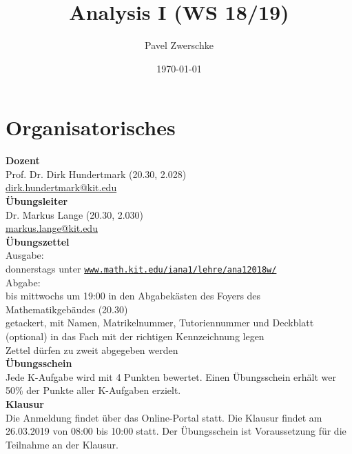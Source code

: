 \documentclass[12pt,a4paper,titlepage]{article} %
\theoremstyle{definition}
\theoremstyle{remark}
\begin{document}
\title{Analysis I (WS 18/19)}
\date{\today}
\author{Pavel Zwerschke}
\maketitle

\tableofcontents
\newpage

\setcounter{section}{-1}
\section{Organisatorisches}
\textbf{Dozent}\\
Prof. Dr. Dirk Hundertmark (20.30, 2.028)\\
\href{mailto:dirk.hundertmark@kit.edu}{dirk.hundertmark@kit.edu}\\
\textbf{Übungsleiter}\\
Dr. Markus Lange (20.30, 2.030)\\
\href{mailto:markus.lange@kit.edu}{markus.lange@kit.edu}\\
\textbf{Übungszettel}\\
Ausgabe:\\
donnerstags unter \href{http://www.math.kit.edu/iana1/lehre/ana12018w/}{\texttt{www.math.kit.edu/iana1/lehre/ana12018w/}}\\
Abgabe:\\
bis mittwochs um 19:00 in den Abgabekästen des Foyers des Mathematikgebäudes (20.30)\\
getackert, mit Namen, Matrikelnummer, Tutoriennummer und Deckblatt (optional) in das Fach mit der richtigen Kennzeichnung legen\\
Zettel dürfen zu zweit abgegeben werden\\
\textbf{Übungsschein}\\
Jede K-Aufgabe wird mit 4 Punkten bewertet. Einen Übungsschein erhält wer 50\% der Punkte aller K-Aufgaben erzielt.\\
\textbf{Klausur}\\
Die Anmeldung findet über das Online-Portal statt. Die Klausur findet am 26.03.2019 von 08:00 bis 10:00 statt. Der Übungsschein ist Voraussetzung für die Teilnahme an der Klausur.

\newpage
\end{document}
